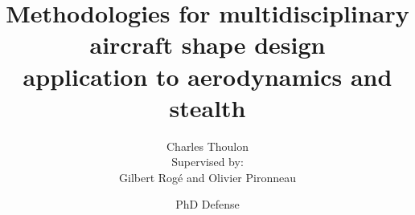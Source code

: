 \title[Aero-stealth shape design] %
{Methodologies for multidisciplinary aircraft shape design\\application to aerodynamics and stealth}


\author[C.~Thoulon, G.~Roge, O.~Pironneau] %
{Charles Thoulon \\ \vspace{2ex} Supervised by: \\Gilbert Rogé and Olivier Pironneau}


\date[26/11/2025] %
{PhD Defense\\
  }

